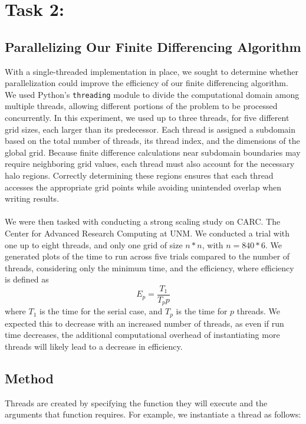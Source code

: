 \documentclass[12pt]{article}
\begin{document}
\newpage

\section{Task 2: }
\subsection{Parallelizing Our Finite Differencing Algorithm}

With a single-threaded implementation in place, we sought to determine whether parallelization could improve the efficiency of our finite differencing algorithm. We used Python's \texttt{threading} module to divide the computational domain among multiple threads, allowing different portions of the problem to be processed concurrently. In this experiment, we used up to three threads, for five different grid sizes, each larger than its predecessor. Each thread is assigned a subdomain based on the total number of threads, its thread index, and the dimensions of the global grid. Because finite difference calculations near subdomain boundaries may require neighboring grid values, each thread must also account for the necessary halo regions. Correctly determining these regions ensures that each thread accesses the appropriate grid points while avoiding unintended overlap when writing results.
\\\\
We were then tasked with conducting a strong scaling study on CARC. The Center for Advanced Research Computing at UNM. We conducted a trial with one up to eight threads, and only one grid of size $n * n$, with $n = 840 * 6$. We generated plots of the time to run across five trials compared to the number of threads, considering only the minimum time, and the efficiency, where efficiency is defined as 
\begin{equation}
    E_p = \frac{T_1}{T_pp}
\end{equation}
where $T_1$ is the time for the serial case, and $T_p$ is the time for $p$ threads. We expected this to decrease with an increased number of threads, as even if run time decreases, the additional computational overhead of instantiating more threads will likely lead to a decrease in efficiency.

\subsection{Method}
Threads are created by specifying the function they will execute and the arguments that function requires. For example, we instantiate a thread as follows:
\end{document}
